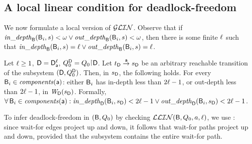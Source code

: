    \subsection{A local linear condition for deadlock-freedom}
   \label{s:condition}
%   

We now formulate a local version of $\GLin$. Observe that if
$\widepth{\B}{\B_i}{s} < \omega \lor \wodepth{\B}{\B_i}{s} < \omega$,
then there is some finite $\l$ such that 
$\widepth{\B}{\B_i}{s} = \l \lor \wodepth{\B}{\B_i}{s} = \l$.


\begin{definition} \label{def:ldfc-k}
\label{def:locLinear} \label{defn:LLin}
Let $\l \ge 1$, $\DS = \dsks{\act}{\l}$, $\QDS = Q_0 \pj \DS$.
Let $\tD \goesto[\act] \sD$ be an arbitrary reachable transition of the subsystem $(\DS, \QDS)$. 
Then, in $\sD$, the following holds. 
For every $\B_i \in \cmps{\act}$:  
either $\B_i$ has in-depth less than $2\l - 1$, or out-depth less than $2\l - 1$, in $\wfg{\dsk{\act}{\l}}{\sD}$. 
Formally,\\
\ind  $\fa \B_i \in \cmps{\act}: 
\widepth{\dsk{\act}{\l}}{\B_i}{\sD} < 2\l-1 \lor \wodepth{\dsk{\act}{\l}}{\B_i}{\sD} < 2\l-1$.
\end{definition}
%
To infer deadlock-freedom in $(\B, Q_0)$ by checking $\LLin(\B, Q_0, a, \l)$, we use : since wait-for edges project up and down,
it follows that wait-for paths project up and down, provided that the subsystem contains the entire wait-for path.

